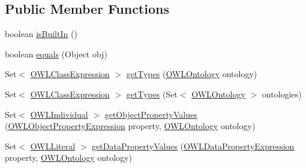 \subsection*{Public Member Functions}
\begin{DoxyCompactItemize}
\item 
boolean \hyperlink{classuk_1_1ac_1_1manchester_1_1cs_1_1owl_1_1owlapi_1_1_o_w_l_individual_impl_a8b01543b82831df2f9e245eb149255e7}{is\-Built\-In} ()
\item 
boolean \hyperlink{classuk_1_1ac_1_1manchester_1_1cs_1_1owl_1_1owlapi_1_1_o_w_l_individual_impl_ac62204dd6b8af2206ae78fdb2b937b80}{equals} (Object obj)
\item 
Set$<$ \hyperlink{interfaceorg_1_1semanticweb_1_1owlapi_1_1model_1_1_o_w_l_class_expression}{O\-W\-L\-Class\-Expression} $>$ \hyperlink{classuk_1_1ac_1_1manchester_1_1cs_1_1owl_1_1owlapi_1_1_o_w_l_individual_impl_a9e3089cd7509ec0ea035456ec937659e}{get\-Types} (\hyperlink{interfaceorg_1_1semanticweb_1_1owlapi_1_1model_1_1_o_w_l_ontology}{O\-W\-L\-Ontology} ontology)
\item 
Set$<$ \hyperlink{interfaceorg_1_1semanticweb_1_1owlapi_1_1model_1_1_o_w_l_class_expression}{O\-W\-L\-Class\-Expression} $>$ \hyperlink{classuk_1_1ac_1_1manchester_1_1cs_1_1owl_1_1owlapi_1_1_o_w_l_individual_impl_aba4a822efef7dda913310a65d625bb92}{get\-Types} (Set$<$ \hyperlink{interfaceorg_1_1semanticweb_1_1owlapi_1_1model_1_1_o_w_l_ontology}{O\-W\-L\-Ontology} $>$ ontologies)
\item 
Set$<$ \hyperlink{interfaceorg_1_1semanticweb_1_1owlapi_1_1model_1_1_o_w_l_individual}{O\-W\-L\-Individual} $>$ \hyperlink{classuk_1_1ac_1_1manchester_1_1cs_1_1owl_1_1owlapi_1_1_o_w_l_individual_impl_a40b3d0583676c6b39e6d19abd10a85b1}{get\-Object\-Property\-Values} (\hyperlink{interfaceorg_1_1semanticweb_1_1owlapi_1_1model_1_1_o_w_l_object_property_expression}{O\-W\-L\-Object\-Property\-Expression} property, \hyperlink{interfaceorg_1_1semanticweb_1_1owlapi_1_1model_1_1_o_w_l_ontology}{O\-W\-L\-Ontology} ontology)
\item 
Set$<$ \hyperlink{interfaceorg_1_1semanticweb_1_1owlapi_1_1model_1_1_o_w_l_literal}{O\-W\-L\-Literal} $>$ \hyperlink{classuk_1_1ac_1_1manchester_1_1cs_1_1owl_1_1owlapi_1_1_o_w_l_individual_impl_aec15137149bf216fc120e092975d6a55}{get\-Data\-Property\-Values} (\hyperlink{interfaceorg_1_1semanticweb_1_1owlapi_1_1model_1_1_o_w_l_data_property_expression}{O\-W\-L\-Data\-Property\-Expression} property, \hyperlink{interfaceorg_1_1semanticweb_1_1owlapi_1_1model_1_1_o_w_l_ontology}{O\-W\-L\-Ontology} ontology)

\end{DoxyCompactItemize}

